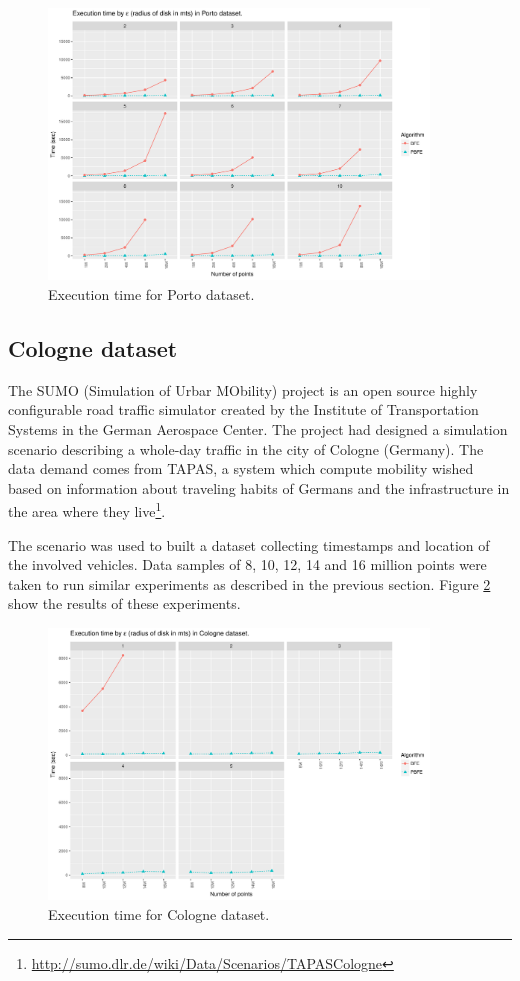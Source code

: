 \documentclass[12pt]{scrartcl}
\begin{document}
\begin{figure}
 \centering
 \includegraphics[width=0.9\textwidth]{figures/porto} 
 \caption{Execution time for Porto dataset.}
 \label{fig:porto}
\end{figure}

\subsection{Cologne dataset}
The SUMO (Simulation of Urbar MObility) project \citep{SUMO2012} is an open source highly configurable road traffic simulator created by the Institute of Transportation Systems in the German Aerospace Center.  The project had designed a simulation scenario describing a whole-day traffic in the city of Cologne (Germany).  The data demand comes from TAPAS, a system which compute mobility wished based on information about traveling habits of Germans and the infrastructure in the area where they live\footnote{\url{http://sumo.dlr.de/wiki/Data/Scenarios/TAPASCologne}}.

The scenario was used to built a dataset collecting timestamps and location of the involved vehicles.  Data samples of 8, 10, 12, 14 and 16 million points were taken to run similar experiments as described in the previous section. Figure \ref{fig:cologne} show the results of these experiments.

\begin{figure}
 \centering
 \includegraphics[width=0.9\textwidth]{figures/cologne} 
 \caption{Execution time for Cologne dataset.}
 \label{fig:cologne}
\end{figure}
\end{document}
